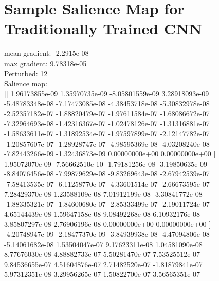 \documentclass{article}
\begin{document}
\section{Sample Salience Map for Traditionally Trained CNN}
mean gradient: -2.2915e-08\\
max gradient: 9.78318e-05\\
Perturbed: 12\\
Salience map:\\
$[[$  1.96173855e-09   1.35970735e-09  -8.05801559e-09   3.28918093e-09 \\
   -5.48783348e-08  -7.17473085e-08  -4.38453718e-08  -5.30832978e-08 \\
   -2.52357182e-07  -1.88820479e-07  -1.97611584e-07  -1.68086672e-07 \\
   -7.32964693e-08  -1.42316367e-07  -1.02478126e-07  -1.31316881e-07 \\
   -1.58633611e-07  -1.31892534e-07  -1.97597899e-07  -2.12147782e-07 \\
   -1.20857607e-07  -1.28928747e-07  -4.98595369e-08  -4.03208240e-08 \\
   -7.82443266e-09  -1.32436873e-09   0.00000000e+00   0.00000000e+00 $]$ \\
    1.95072070e-09  -7.56662510e-10  -1.79181256e-08  -3.19850635e-09 \\
   -8.84076456e-08  -7.99879629e-08  -9.83269643e-08  -2.67942539e-07 \\
   -7.58413535e-07  -6.11258770e-07  -4.33601514e-07  -2.66673595e-07 \\
    7.28429370e-08   1.23588109e-08   7.01912199e-08  -3.30841772e-08 \\
   -1.88335321e-07  -1.84600680e-07  -2.85333499e-07  -2.19011724e-07 \\
    4.65144439e-08   1.59647158e-08   9.08492268e-08   6.10932176e-08 \\
	3.85807297e-08   2.76906196e-08   0.00000000e+00   0.00000000e+00 $]$ \\
   -4.20748947e-09  -2.18477370e-09  -3.84939938e-08  -4.47094806e-08 \\
   -5.14061682e-08   1.53504047e-07   9.17623311e-08   1.04581090e-08 \\
    8.77676030e-08   4.88882733e-07   5.50281470e-07   7.53525512e-07 \\
    9.84536655e-07   4.51604876e-07   2.71482520e-07  -1.81879841e-07 \\
    5.97312351e-08   3.29956265e-07   1.50822700e-07   3.56565351e-07 \\
\end{document}

